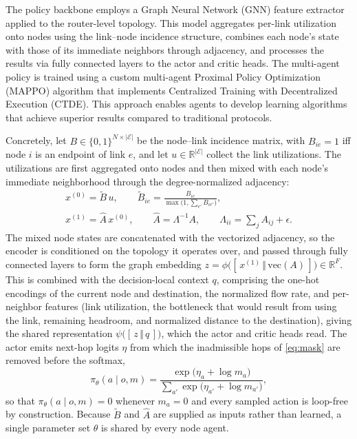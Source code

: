 The policy backbone employs a Graph Neural Network (GNN) feature extractor applied to the router-level topology. This model aggregates per-link utilization onto nodes using the link–node incidence structure, combines each node's state with those of its immediate neighbors through adjacency, and processes the results via fully connected layers to the actor and critic heads. The multi-agent policy is trained using a custom multi-agent Proximal Policy Optimization (MAPPO) algorithm that implements Centralized Training with Decentralized Execution (CTDE). This approach enables agents to develop learning algorithms that achieve superior results compared to traditional protocols.

Concretely, let $B\in\{0,1\}^{N\times|\mathcal{E}|}$ be the node--link incidence
matrix, with $B_{ie}=1$ iff node $i$ is an endpoint of link $e$, and let
$u\in\mathbb{R}^{|\mathcal{E}|}$ collect the link utilizations. The utilizations
are first aggregated onto nodes and then mixed with each node's immediate
neighborhood through the degree-normalized adjacency:
\begin{equation}\label{eq:gnn}
\begin{gathered}
x^{(0)}=\tilde{B}\,u,
\qquad
\tilde{B}_{ie}=\frac{B_{ie}}{\max\bigl(1,\sum_{e'}B_{ie'}\bigr)}, \\[3pt]
x^{(1)}=\hat{A}\,x^{(0)},
\qquad
\hat{A}=\Lambda^{-1}A,
\qquad
\Lambda_{ii}=\sum_{j}A_{ij}+\epsilon .
\end{gathered}
\end{equation}
The mixed node states are concatenated with the vectorized adjacency, so the
encoder is conditioned on the topology it operates over, and passed through
fully connected layers to form the graph embedding
$z=\phi\bigl([\,x^{(1)}\,\Vert\,\mathrm{vec}(A)\,]\bigr)\in\mathbb{R}^{F}$. This
is combined with the decision-local context $q$, comprising the one-hot
encodings of the current node and destination, the normalized flow rate, and
per-neighbor features (link utilization, the bottleneck that would result from
using the link, remaining headroom, and normalized distance to the
destination), giving the shared representation $\psi\bigl([\,z\,\Vert\,q\,]\bigr)$, which the actor
and critic heads read. The actor emits next-hop logits $\eta$ from which the
inadmissible hops of \eqref{eq:mask} are removed before the softmax,
\begin{equation}\label{eq:policy}
\pi_\theta(a\mid o,m)=\frac{\exp\bigl(\eta_a+\log m_a\bigr)}
{\sum_{a'}\exp\bigl(\eta_{a'}+\log m_{a'}\bigr)},
\end{equation}
so that $\pi_\theta(a\mid o,m)=0$ whenever $m_a=0$ and every sampled action is
loop-free by construction. Because $\tilde{B}$ and $\hat{A}$ are supplied as
inputs rather than learned, a single parameter set $\theta$ is shared by every
node agent.

